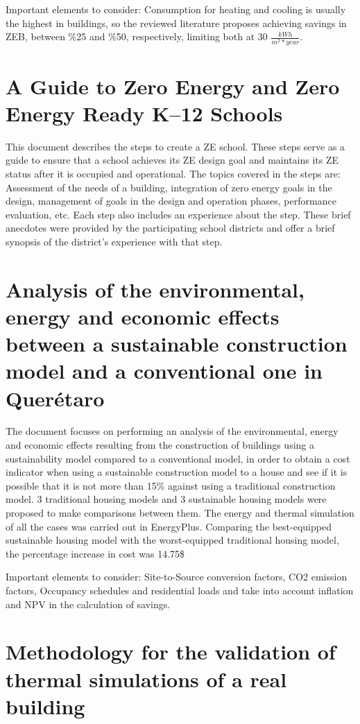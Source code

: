 Important elements to consider: Consumption for heating and cooling is usually the highest in buildings, so the reviewed literature proposes achieving savings in ZEB, between $\%$25 and $\%$50, respectively, limiting both at 30 $\frac{kWh}{m^{2}*year}$.


\section{A Guide to Zero Energy and Zero Energy Ready K–12 Schools}

This document describes the steps to create a ZE school. These steps serve as a guide to ensure that a school achieves its ZE design goal and maintains its ZE status after it is occupied and operational. The topics covered in the steps are: Assessment of the needs of a building, integration of zero energy goals in the design, management of goals in the design and operation phases, performance evaluation, etc. Each step also includes an experience about the step. These brief anecdotes were provided by the participating school districts and offer a brief synopsis of the district's experience with that step.


\section{Analysis of the environmental, energy and economic effects between a sustainable construction model and a conventional one in Querétaro}

The document focuses on performing an analysis of the environmental, energy and economic effects resulting from the construction of buildings using a sustainability model compared to a conventional model, in order to obtain a cost indicator when using a sustainable construction model to a house and see if it is possible that it is not more than 15$\%$ against using a traditional construction model. 3 traditional housing models and 3 sustainable housing models were proposed to make comparisons between them. The energy and thermal simulation of all the cases was carried out in EnergyPlus. Comparing the best-equipped sustainable housing model with the worst-equipped traditional housing model, the percentage increase in cost was 14.75\$%

Important elements to consider: Site-to-Source conversion factors, CO2 emission factors, Occupancy schedules and residential loads and take into account inflation and NPV in the calculation of savings.

\section{Methodology for the validation of thermal simulations of a real building}

